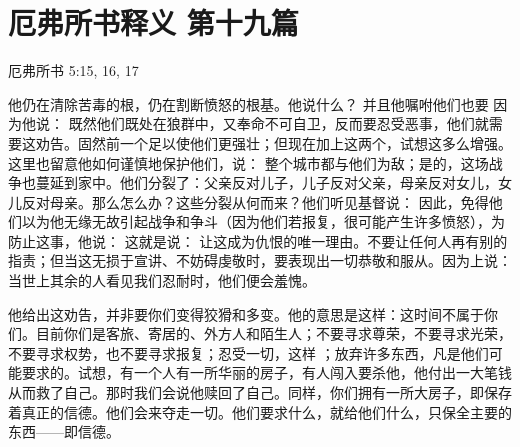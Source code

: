 

\section{厄弗所书释义 第十九篇}

厄弗所书 5:15, 16, 17\par

\par

他仍在清除苦毒的根，仍在割断愤怒的根基。他说什么？  并且他嘱咐他们也要  因为他说：  既然他们既处在狼群中，又奉命不可自卫，反而要忍受恶事，他们就需要这劝告。固然前一个足以使他们更强壮；但现在加上这两个，试想这多么增强。这里也留意他如何谨慎地保护他们，说： 整个城市都与他们为敌；是的，这场战争也蔓延到家中。他们分裂了：父亲反对儿子，儿子反对父亲，母亲反对女儿，女儿反对母亲。那么怎么办？这些分裂从何而来？他们听见基督说：  因此，免得他们以为他无缘无故引起战争和争斗（因为他们若报复，很可能产生许多愤怒），为防止这事，他说： 这就是说： 让这成为仇恨的唯一理由。不要让任何人再有别的指责；但当这无损于宣讲、不妨碍虔敬时，要表现出一切恭敬和服从。因为上说：  当世上其余的人看见我们忍耐时，他们便会羞愧。\par

\par

他给出这劝告，并非要你们变得狡猾和多变。他的意思是这样：这时间不属于你们。目前你们是客旅、寄居的、外方人和陌生人；不要寻求尊荣，不要寻求光荣，不要寻求权势，也不要寻求报复；忍受一切，这样 ；放弃许多东西，凡是他们可能要求的。试想，有一个人有一所华丽的房子，有人闯入要杀他，他付出一大笔钱从而救了自己。那时我们会说他赎回了自己。同样，你们拥有一所大房子，即保存着真正的信德。他们会来夺走一切。他们要求什么，就给他们什么，只保全主要的东西——即信德。\par

